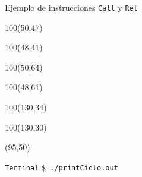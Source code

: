 \documentclass[aspectratio=169]{beamer}
\begin{document}
\begin{frame}[fragile]{Ejemplo de instrucciones \texttt{Call} y \texttt{Ret}}
    \begin{textblock}{100}(50,47)   \end{textblock}
    \begin{textblock}{100}(48,41)   \end{textblock}
    \begin{textblock}{100}(50,64)   \end{textblock}
    \begin{textblock}{100}(48,61)   \end{textblock}
    \begin{textblock}{100}(130,34)  \end{textblock}
    \begin{textblock}{100}(130,30)  \end{textblock}
    \begin{textblock}{50}(95,50)
    \begin{block}{\scriptsize \texttt{Terminal}}
    \scriptsize
    \texttt{\$ ./printCiclo.out}\\
    \uncover<6->{\texttt{Hola Mundo}\\}
    \end{block}
    \end{textblock}
\end{frame}
\end{document}
